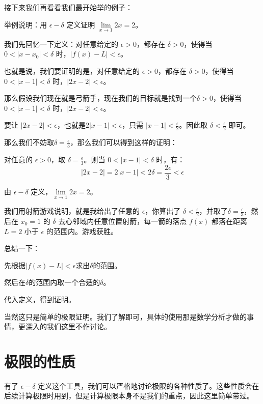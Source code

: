 接下来我们再看看我们最开始举的例子：

\begin{myexample}
  举例说明：用 $\epsilon-\delta$ 定义证明 $\lim\limits_{x \to 1}2x = 2$。

  我们先回忆一下定义：对任意给定的 $\epsilon > 0$，都存在 $\delta > 0$，使得当 $0 < |x - x_0| < \delta$ 时，$|f(x) - L| < \epsilon$。

  也就是说，我们要证明的是，对任意给定的 $\epsilon > 0$，都存在 $\delta > 0$，使得当 $0 < |x - 1| < \delta$ 时，$|2x - 2| < \epsilon$。

  那么假设我们现在就是弓箭手，现在我们的目标就是找到一个$\delta > 0$，使得当 $0 < |x - 1| < \delta$ 时，$|2x - 2| < \epsilon$。

  要让 $|2x - 2| < \epsilon$，也就是$2|x - 1| < \epsilon$，只需 $|x - 1| < \frac{\epsilon}{2}$。因此取 $\delta < \frac{\epsilon}{2}$ 即可。

  那么我们不妨取$\delta = \frac{\epsilon}{3}$，那么我们可以得到这样的证明：

对任意的 $\epsilon > 0$，取 $\delta = \frac{\epsilon}{3}$。则当 $0 < |x - 1| < \delta$ 时，有：
\[
|2x - 2| = 2|x - 1| < 2\delta = \frac{2\epsilon}{3} < \epsilon
\]

由 $\epsilon-\delta$ 定义，$\lim\limits_{x \to 1} 2x = 2$。

\end{myexample}

我们用射箭游戏说明，就是我给出了任意的 $\epsilon$，你算出了 $\delta < \frac{\epsilon}{2}$，并取了$\delta = \frac{\epsilon}{3}$，然后在 $x_0=1$ 的 $\delta$ 去心邻域内任意位置射箭，每一箭的落点 $f(x)$ 都落在距离 $L=2$ 小于 $\epsilon$ 的范围内。游戏获胜。

总结一下：

先根据$|f(x) - L| < \epsilon$求出$\delta$的范围。

然后在$\delta$的范围内取一个合适的$\delta$。

代入定义，得到证明。

当然这只是简单的极限证明。我们了解即可，具体的使用那是数学分析才做的事情，更深入的我们这里不作讨论。

\section{极限的性质}

有了 $\epsilon-\delta$ 定义这个工具，我们可以严格地讨论极限的各种性质了。这些性质会在后续计算极限时用到，但是计算极限本身不是我们的重点，因此这里简单带过。

